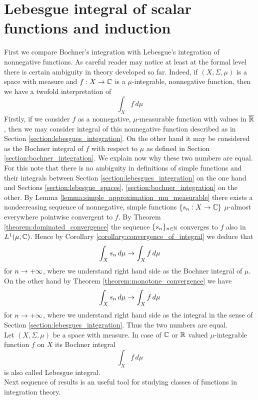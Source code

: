 \section{Lebesgue integral of scalar functions and induction}
\noindent
First we compare Bochner's integration with Lebesgue's integration of nonnegative functions. As careful reader may notice at least at the formal level there is certain ambiguity in theory developed so far. Indeed, if $(X,\Sigma,\mu)$ is a space with measure and $f:X\rightarrow {\mathbb C}$ is a $\mu$-integrable, nonnegative function, then we have a twofold interpretation of
$$\int_Xf\,d\mu$$
Firstly, if we consider $f$ as a nonnegative, $\mu$-measurable function with values in $\overline{{\mathbb R}}$, then we may consider integral of this nonnegative function described as in Section \ref{section:lebesgues_integration}. On the other hand it may be considered as the Bochner integral of $f$ with respect to $\mu$ as defined in Section \ref{section:bochner_integration}. We explain now why these two numbers are equal. For this note that there is no ambiguity in definitions of simple functions and their integrals between Section \ref{section:lebesgues_integration} on the one hand and Sections \ref{section:lebesgue_spaces}, \ref{section:bochner_integration} on the other. By Lemma \ref{lemma:simple_approximation_mu_measurable} there exists a nondecreasing sequence of nonnegative, simple functions $\{s_n:X\rightarrow {\mathbb C}\}$ $\mu$-almost everywhere pointwise convergent to $f$. By Theorem \ref{theorem:dominated_convergence} the sequence $\{s_n\}_{n\in {\mathbb N}}$ converges to $f$ also in $L^1(\mu,{\mathbb C})$. Hence by Corollary \ref{corollary:convergence_of_integral} we deduce that
$$\int_Xs_n\,d\mu\rightarrow \int_Xf\,d\mu$$
for $n\rightarrow +\infty$, where we understand right hand side as the Bochner integral of $\mu$. On the other hand by Theorem \ref{theorem:monotone_convergence} we have
$$\int_Xs_n\,d\mu \rightarrow \int_Xf\,d\mu$$
for $n\rightarrow +\infty$, where we understand right hand side as the integral in the sense of Section \ref{section:lebesgues_integration}. Thus the two numbers are equal.\\
Let $(X,\Sigma, \mu)$ be a space with measure. In case of ${\mathbb C}$ or ${\mathbb R}$ valued $\mu$-integrable function $f$ on $X$ its Bochner integral
$$\int_X f\,d\mu$$
is also called Lebesgue integral.\\
Next sequence of results is an useful tool for studying classes of functions in integration theory.

